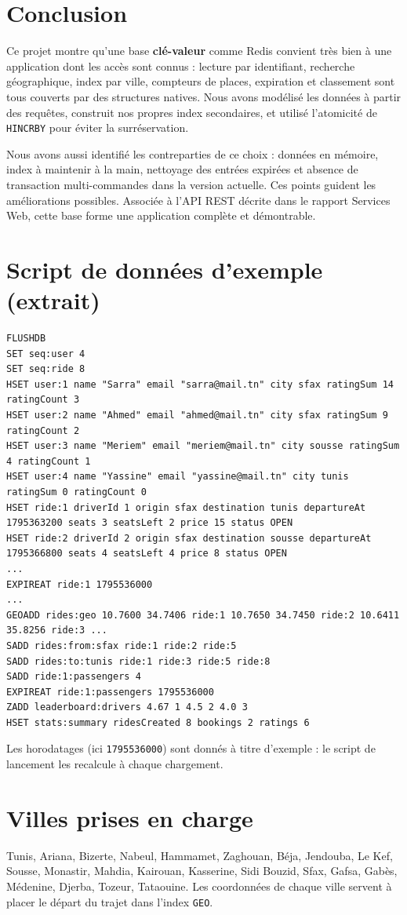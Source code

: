 \documentclass[11pt,a4paper]{article}
\begin{document}
\section{Conclusion}
Ce projet montre qu'une base \textbf{cl\'e-valeur} comme Redis convient tr\`es bien \`a une application dont les acc\`es sont connus : lecture par identifiant, recherche g\'eographique, index par ville, compteurs de places, expiration et classement sont tous couverts par des structures natives. Nous avons mod\'elis\'e les donn\'ees \`a partir des requ\^etes, construit nos propres index secondaires, et utilis\'e l'atomicit\'e de \texttt{HINCRBY} pour \'eviter la surr\'eservation.

Nous avons aussi identifi\'e les contreparties de ce choix : donn\'ees en m\'emoire, index \`a maintenir \`a la main, nettoyage des entr\'ees expir\'ees et absence de transaction multi-commandes dans la version actuelle. Ces points guident les am\'eliorations possibles. Associ\'ee \`a l'API REST d\'ecrite dans le rapport Services Web, cette base forme une application compl\`ete et d\'emontrable.

\appendix
\section{Script de donn\'ees d'exemple (extrait)}
\begin{lstlisting}
FLUSHDB
SET seq:user 4
SET seq:ride 8
HSET user:1 name "Sarra" email "sarra@mail.tn" city sfax ratingSum 14 ratingCount 3
HSET user:2 name "Ahmed" email "ahmed@mail.tn" city sfax ratingSum 9 ratingCount 2
HSET user:3 name "Meriem" email "meriem@mail.tn" city sousse ratingSum 4 ratingCount 1
HSET user:4 name "Yassine" email "yassine@mail.tn" city tunis ratingSum 0 ratingCount 0
HSET ride:1 driverId 1 origin sfax destination tunis departureAt 1795363200 seats 3 seatsLeft 2 price 15 status OPEN
HSET ride:2 driverId 2 origin sfax destination sousse departureAt 1795366800 seats 4 seatsLeft 4 price 8 status OPEN
...
EXPIREAT ride:1 1795536000
...
GEOADD rides:geo 10.7600 34.7406 ride:1 10.7650 34.7450 ride:2 10.6411 35.8256 ride:3 ...
SADD rides:from:sfax ride:1 ride:2 ride:5
SADD rides:to:tunis ride:1 ride:3 ride:5 ride:8
SADD ride:1:passengers 4
EXPIREAT ride:1:passengers 1795536000
ZADD leaderboard:drivers 4.67 1 4.5 2 4.0 3
HSET stats:summary ridesCreated 8 bookings 2 ratings 6
\end{lstlisting}
Les horodatages (ici \texttt{1795536000}) sont donn\'es \`a titre d'exemple : le script de lancement les recalcule \`a chaque chargement.

\section{Villes prises en charge}
Tunis, Ariana, Bizerte, Nabeul, Hammamet, Zaghouan, B\'eja, Jendouba, Le Kef, Sousse, Monastir, Mahdia, Kairouan, Kasserine, Sidi Bouzid, Sfax, Gafsa, Gab\`es, M\'edenine, Djerba, Tozeur, Tataouine. Les coordonn\'ees de chaque ville servent \`a placer le d\'epart du trajet dans l'index \texttt{GEO}.
\end{document}
